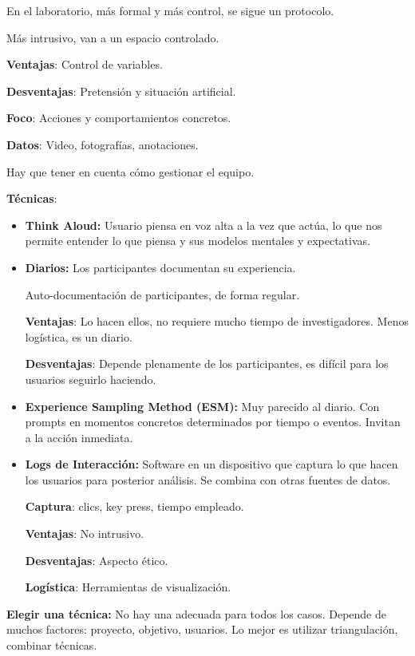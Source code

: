 \documentclass[12pt, twoside, openright]{report} %
\begin{document}
En el laboratorio, más formal y más control, se sigue un protocolo.

Más intrusivo, van a un espacio controlado.

\textbf{Ventajas}: Control de variables.

\textbf{Desventajas}: Pretensión y situación artificial.

\textbf{Foco}: Acciones y comportamientos concretos.

\textbf{Datos}: Video, fotografías, anotaciones.

Hay que tener en cuenta cómo gestionar el equipo.

\textbf{Técnicas}:
\begin{itemize}
	\item \textbf{Think Aloud:} Usuario piensa en voz alta a la vez que
	      actúa, lo que nos permite entender lo que piensa y sus modelos mentales
	      y expectativas.
	\item \textbf{Diarios:} Los participantes documentan su experiencia.

	      Auto-documentación de participantes, de forma regular.

	      \textbf{Ventajas}: Lo hacen ellos, no requiere mucho tiempo
	      de investigadores. Menos logística, es un diario.

	      \textbf{Desventajas}: Depende plenamente de los
	      participantes, es difícil para los usuarios seguirlo haciendo.
	\item \textbf{Experience Sampling Method (ESM):} Muy parecido al
	      diario. Con prompts en momentos concretos determinados por tiempo o
	      eventos. Invitan a la acción inmediata.
	\item \textbf{Logs de Interacción:} Software en un dispositivo
	      que captura lo que hacen los usuarios para posterior análisis.     Se combina con otras fuentes de datos.


	      \textbf{Captura}: clics, key press, tiempo empleado.

	      \textbf{Ventajas}: No intrusivo.

	      \textbf{Desventajas}: Aspecto ético.

	      \textbf{Logística}: Herramientas de visualización.
\end{itemize}

\textbf{Elegir una técnica:} No hay una adecuada para todos los casos.
Depende de muchos factores: proyecto, objetivo, usuarios. Lo mejor es utilizar triangulación, combinar técnicas.
\end{document}
